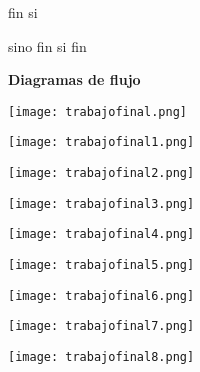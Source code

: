 \documentclass{article}
\begin{document}
\begin{multicols}{2}
        fin si
        
    sino 
fin si 
fin

\begin{center}
    \textbf{Diagramas de flujo }
\end{center}
    \texttt{[image: trabajofinal.png]}
    
    \texttt{[image: trabajofinal1.png]}
    
    
    
    \texttt{[image: trabajofinal2.png]}
    
    
    
    
    \texttt{[image: trabajofinal3.png]}
    
    \texttt{[image: trabajofinal4.png]}
    
    \texttt{[image: trabajofinal5.png]}
    
    \texttt{[image: trabajofinal6.png]}
    
    \texttt{[image: trabajofinal7.png]}
    
    
    \texttt{[image: trabajofinal8.png]}

\end{multicols}
\end{document}
